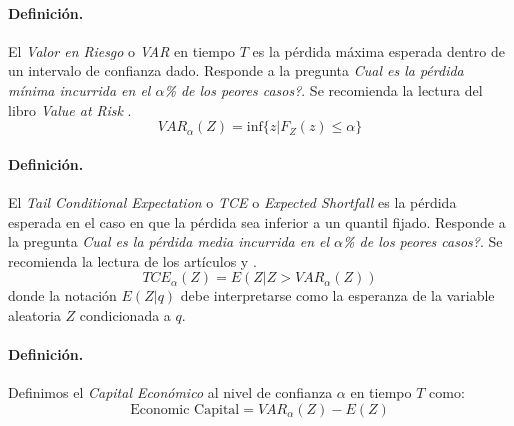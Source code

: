\paragraph{Definici\'on.} El \emph{Valor en Riesgo} o
\emph{VAR} en tiempo $T$ es la p\'erdida m\'axima esperada dentro
de un intervalo de confianza dado. Responde a la pregunta \emph{Cual es la
p\'erdida m\'inima incurrida en el $\alpha$\% de los peores casos?}. Se recomienda
la lectura del libro \emph{Value at Risk} \cite{var:jorion}.
\begin{equation}
VAR_{\alpha}(Z) = \textrm{inf}\{z | F_Z(z) \leq \alpha \}
\end{equation}

\paragraph{Definici\'on.} El \emph{Tail Conditional Expectation}
 o \emph{TCE} o
\emph{Expected Shortfall} es la p\'erdida esperada
en el caso en que la p\'erdida sea inferior a un quantil fijado.
Responde a la pregunta \emph{Cual es la p\'erdida media incurrida en el
$\alpha$\% de los peores casos?}. Se recomienda la lectura de los art\'iculos
\cite{var:varbad} y \cite{var:eshortfall}.
\begin{equation}
TCE_{\alpha}(Z) = E(Z | Z > VAR_{\alpha}(Z))
\end{equation}
donde la notaci\'on $E(Z|q)$ debe interpretarse como la esperanza de la variable
aleatoria $Z$ condicionada a $q$.

\paragraph{Definici\'on.} Definimos el \emph{Capital Econ\'omico}
 al nivel de confianza $\alpha$ en tiempo $T$ como:
\begin{equation}
\textrm{Economic Capital} = VAR_{\alpha}(Z) - E(Z)
\end{equation}

